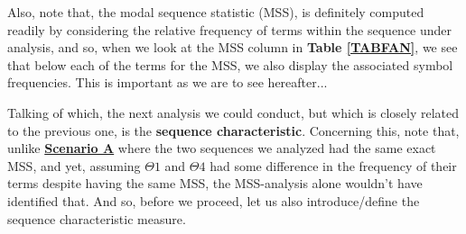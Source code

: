 \documentclass[a4paper, 18pt]{book} %
\newtheorem{defn}{Definition}
\begin{document}
Also, note that, the modal sequence statistic (MSS), is definitely computed readily by considering the relative frequency of terms within the sequence under analysis, and so, when we look at the MSS column in \textbf{Table \ref{TABFAN}}, we see that below each of the terms for the MSS, we also display the associated symbol frequencies. This is important as we are to see hereafter...

Talking of which, the next analysis we could conduct, but which is closely related to the previous one, is the \textbf{sequence characteristic}. Concerning this, note that, unlike \textbf{\hyperref[SECSCENA]{Scenario A}} where the two sequences we analyzed had the same exact MSS, and yet, assuming $\Theta1$ and $\Theta4$ had some difference in the frequency of their terms despite having the same MSS, the MSS-analysis alone wouldn't have identified that. And so, before we proceed, let us also introduce/define the sequence characteristic measure.


\begin{center}
\end{center}
\end{document}
